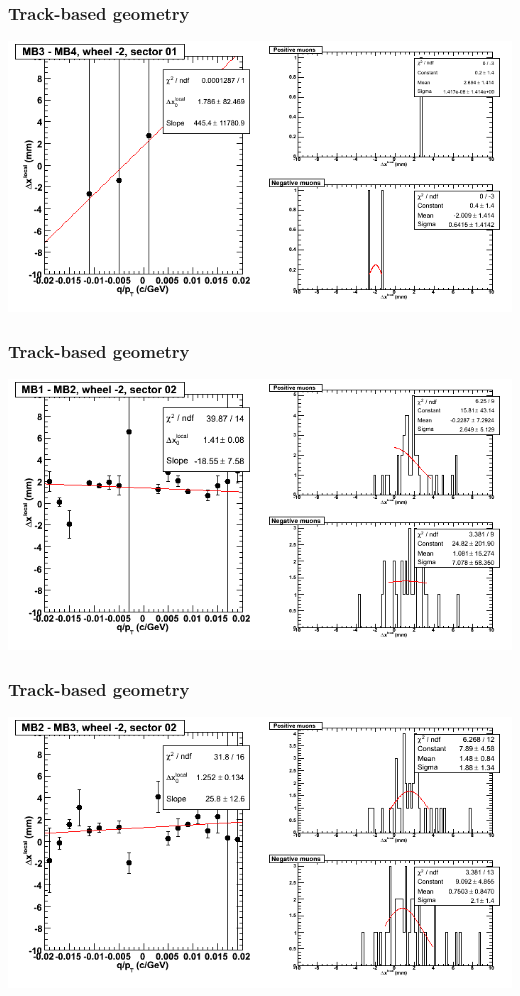 \documentclass[compress]{beamer}
\begin{document}
\begin{frame}
\frametitle{Track-based geometry}
\includegraphics[width=\linewidth]{NOV4_segdiffs/dt13_resid_A_01_34.png}
\end{frame}

\begin{frame}
\frametitle{Track-based geometry}
\includegraphics[width=\linewidth]{NOV4_segdiffs/dt13_resid_A_02_12.png}
\end{frame}

\begin{frame}
\frametitle{Track-based geometry}
\includegraphics[width=\linewidth]{NOV4_segdiffs/dt13_resid_A_02_23.png}
\end{frame}
\end{document}

